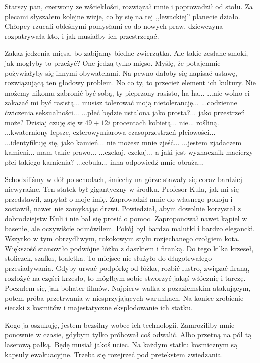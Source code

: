 Starszy pan, czerwony ze wściekłości, rozwiązał mnie i poprowadził od stołu. 
Za plecami słyszałem kolejne wizje, co by się na tej ,,lewackiej'' planecie działo.
Chłopcy rzucali obleśnymi pomysłami co do nowych praw, dziewczyna rozpatrywała kto, i jak musiałby ich przestrzegać.
\begin{dialogue}
\ds{} Zakaz jedzenia mięsa, bo zabijamy biedne zwierzątka.
\ds{} Ale takie zesłane smoki, jak mogłyby to przeżyć? One jedzą tylko mięso.
\ds{} Myślę, że potajemnie pożywiałyby się innymi obywatelami.
\ds{} Na pewno dałoby się napisać ustawę, rozwiązującą ten głodowy problem.
\ds{} No co ty, to przecież element ich kultury. Nie możemy nikomu zabronić być sobą, ty pieprzony rasisto, ha ha...
\ds{} ...nie wolno ci zakazać mi być rasistą... musisz tolerować moją nietolerancję...
\ds{} ...codzienne ćwiczenia seksualności...
\ds{} ...płeć będzie ustalona jako prosta?... jako przestrzeń może?
\ds{} Dzisiaj czuję się w $49 + 12i$ procentach kobietą... nie... rośliną.
\ds{} ...kwaterniony lepsze, czterowymiarowa czasoprzestrzeń płciowości...
\ds{} ...identyfikuję się, jako kamień... nie możesz mnie zjeść...
\ds{} ...jestem zjadaczem kamieni... mam takie prawo...
\ds{} ...czekaj, czekaj... a jaki jest wyznacznik macierzy płci takiego kamienia?
\ds{} ...cebula... inna odpowiedź mnie obraża...
\end{dialogue}

Schodziliśmy w dół po schodach, śmiechy na górze stawały się coraz bardziej niewyraźne.
Ten statek był gigantyczny w środku. Profesor Kula, jak mi się przedstawił, zapytał o moje imię.
Zaprowadził mnie do własnego pokoju i zostawił, nawet nie zamykając drzwi. 
Powiedział, abym dowolnie korzystał z dobrodziejstw Kuli i nie bał się prosić o pomoc. 
Zaproponował nawet kąpiel w basenie, ale oczywiście odmówiłem.
Pokój był bardzo malutki i bardzo elegancki.
Wszytko w tym obrzydliwym, rokokowym stylu rozjechanego czołgiem kota.
Większość stanowiło podwójne łóżko z daszkiem i firanką.
Do tego kilka krzeseł, stoliczek, szafka, toaletka.
To miejsce nie służyło do długotrwałego przesiadywania.
Gdyby urwać podpórkę od łóżka, rozbić lustro, związać firaną, rozłożyć na części krzesło, to mógłbym sobie stworzyć jakąś włócznię i tarczę.
Poczułem się, jak bohater filmów. Najpierw walka z pozaziemskim atakującym, potem próba przetrwania w niesprzyjających warunkach.
Na koniec zrobienie sieczki z kosmitów i majestatyczne eksplodowanie ich statku.


Kogo ja oszukuję, jestem bezsilny wobec ich technologii.
Zamroziliby mnie ponownie w czasie, gdybym tylko próbował coś odwalić.
Albo przetną na pół tą laserową pałką.
Będę musiał jakoś uciec. Na każdym statku kosmicznym są kapsuły ewakuacyjne.
Trzeba się rozejrzeć pod pretekstem zwiedzania.

